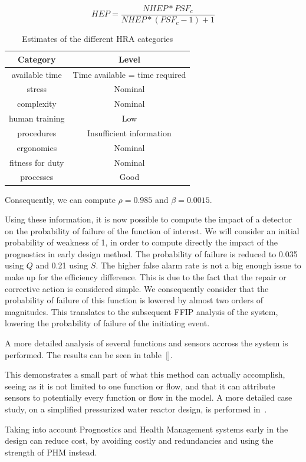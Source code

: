 \begin{equation}
HEP = \frac{NHEP * PSF_c}{NHEP * (PSF_c-1) + 1}
\label{eq:hra}
\end{equation}

\begin{table}[t]
\centering
\caption{Estimates of the different HRA categories}
\label{tab:hra}
\begin{tabular}{|c|c|}
\hline
Category         & Level                          \\ \hline \hline
available time   & Time available = time required \\ \hline
stress           & Nominal                        \\ \hline
complexity       & Nominal                        \\ \hline
human training   & Low                            \\ \hline
procedures       & Insufficient information       \\ \hline
ergonomics       & Nominal                        \\ \hline
fitness for duty & Nominal                        \\ \hline
processes        & Good                           \\ \hline
\end{tabular}
\end{table}

Consequently, we can compute $\rho = 0.985$ and $\beta = 0.0015$.

Using these information, it is now possible to compute the impact of a detector on the probability of failure of the function of interest. We will consider an initial probability of weakness of 1, in order to compute directly the impact of the prognostics in early design method. The probability of failure is reduced to 0.035 using $Q$ and 0.21 using $S$. The higher false alarm rate is not a  big enough issue to make up for the efficiency difference. This is due to the fact that the repair or corrective action is considered simple. We consequently consider that the probability of failure of this function is lowered by almost two orders of magnitudes. This translates to the subsequent FFIP analysis of the system, lowering the probability of failure of the initiating event.

A more detailed analysis of several functions and sensors accross the system is performed. The results can be seen in table~\ref{}.

This demonstrates a small part of what this method can actually accomplish, seeing as it is not limited to one function or flow, and that it can attribute sensors to potentially every function or flow in the model. A more detailed case study, on a simplified pressurized water reactor design, is performed in~\cite{lher2016}.

Taking into account Prognostics and Health Management systems early in the design can reduce cost, by avoiding costly and redundancies and using the strength of PHM instead.


